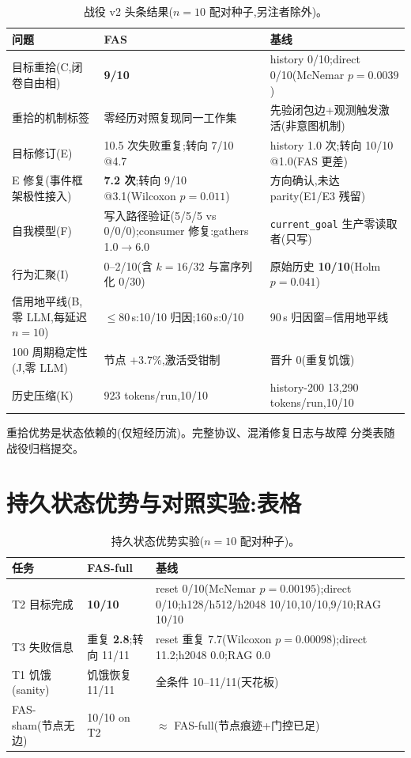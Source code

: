 \documentclass[10pt,a4paper]{ctexart}
\begin{document}
\begin{table}[h]
\centering\small
\caption{战役 v2 头条结果($n{=}10$ 配对种子,另注者除外)。}
\label{tab:s-campaign-zh}
\begin{tabular}{L{4.6cm}L{4.6cm}L{5.6cm}}
\toprule
\textbf{问题} & \textbf{FAS} & \textbf{基线} \\
\midrule
目标重拾(C,闭卷自由相) & \textbf{9/10} & history 0/10;direct 0/10(McNemar $p{=}0.0039$) \\
重拾的机制标签 & 零经历对照复现同一工作集 & 先验闭包边+观测触发激活(非意图机制) \\
目标修订(E) & 10.5 次失败重复;转向 7/10 @4.7 & history 1.0 次;转向 10/10 @1.0(FAS 更差) \\
E 修复(事件框架极性接入) & \textbf{7.2 次};转向 9/10 @3.1(Wilcoxon $p{=}0.011$) & 方向确认,未达 parity(E1/E3 残留) \\
自我模型(F) & 写入路径验证(5/5/5 vs 0/0/0);consumer 修复:gathers 1.0$\rightarrow$6.0 & \texttt{current\_goal} 生产零读取者(只写) \\
行为汇聚(I) & 0--2/10(含 $k{=}16/32$ 与富序列化 0/30) & 原始历史 \textbf{10/10}(Holm $p{=}0.041$) \\
信用地平线(B,零 LLM,每延迟 $n{=}10$) & $\le$80\,s:10/10 归因;160\,s:0/10 & 90\,s 归因窗=信用地平线 \\
100 周期稳定性(J,零 LLM) & 节点 $+3.7\%$,激活受钳制 & 晋升 0(重复饥饿) \\
历史压缩(K) & 923 tokens/run,10/10 & history-200 13{,}290 tokens/run,10/10 \\
\bottomrule
\end{tabular}
\end{table}

重拾优势是状态依赖的(仅短经历流)。完整协议、混淆修复日志与故障
分类表随战役归档提交。


\section{持久状态优势与对照实验:表格}
\label{s16:psa}

\begin{table}[h]
\centering\small
\caption{持久状态优势实验($n{=}10$ 配对种子)。}
\label{tab:s-psa-zh}
\begin{tabular}{L{4.2cm}L{4.2cm}L{5.6cm}}
\toprule
\textbf{任务} & \textbf{FAS-full} & \textbf{基线} \\
\midrule
T2 目标完成 & \textbf{10/10} & reset 0/10(McNemar $p{=}0.00195$);direct 0/10;h128/h512/h2048 10/10,10/10,9/10;RAG 10/10 \\
T3 失败信息 & 重复 \textbf{2.8};转向 11/11 & reset 重复 7.7(Wilcoxon $p{=}0.00098$);direct 11.2;h2048 0.0;RAG 0.0 \\
T1 饥饿(sanity) & 饥饿恢复 11/11 & 全条件 10--11/11(天花板) \\
\midrule
FAS-sham(节点无边) & 10/10 on T2 & $\approx$ FAS-full(节点痕迹+门控已足) \\
\bottomrule
\end{tabular}
\end{table}
\end{document}
